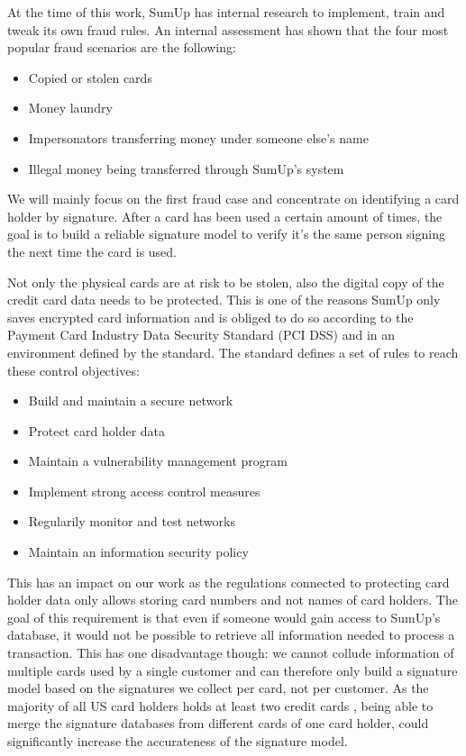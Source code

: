 \documentclass[a4paper, oneside]{csthesis}
\begin{document}
At the time of this work, SumUp has internal research to implement, train and tweak its own fraud rules. An internal assessment has shown that the four most popular fraud scenarios are the following:


\begin{itemize}
    \item Copied or stolen cards
    \item Money laundry
    \item Impersonators transferring money under someone else's name
    \item Illegal money being transferred through SumUp's system
\end{itemize}

We will mainly focus on the first fraud case and concentrate on identifying a card holder by signature. After a card has been used a certain amount of times, the goal is to  build a reliable signature model to verify it's the same person signing the next time the card is used.

Not only the physical cards are at risk to be stolen, also the digital copy of the credit card data needs to be protected. This is one of the reasons SumUp only saves encrypted card information and is obliged to do so according to the Payment Card Industry Data Security Standard (PCI DSS) and in an environment defined by the standard. The standard defines a set of rules to reach these control objectives:
\begin{itemize}
\item Build and maintain a secure network
\item Protect card holder data
\item Maintain a vulnerability management program
\item Implement strong access control measures
\item Regularily monitor and test networks
\item Maintain an information security policy
\end{itemize}

This has an impact on our work as the regulations connected to  protecting card holder data only allows storing card numbers and not names of card holders. The goal of this requirement is that even if someone would gain access to SumUp's database, it would not be possible to retrieve all information needed to process a transaction. This has one disadvantage though: we cannot collude information of multiple cards used by a single customer and can therefore only build a signature model based on the signatures we collect per card, not per customer. As the majority of all US card holders holds at least two credit cards \cite{woolsey2010credit}, being able to merge the signature databases from different cards of one card holder, could significantly increase the accurateness of the signature model.
\end{document}
